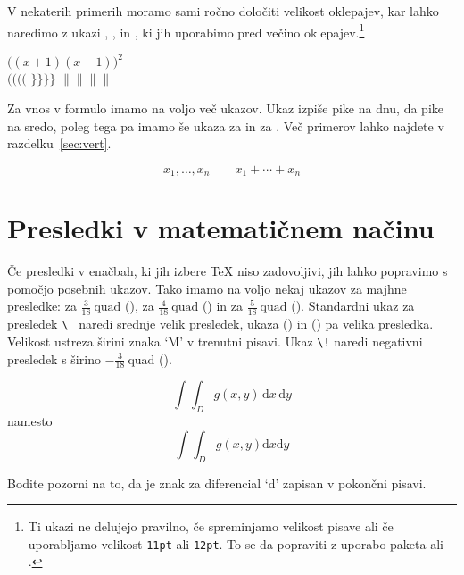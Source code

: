 V nekaterih primerih moramo sami ročno določiti velikost oklepajev, kar lahko
naredimo z ukazi , ,  in 
, ki jih uporabimo pred večino oklepajev.\footnote{Ti ukazi
  ne delujejo pravilno, če spreminjamo velikost pisave ali če uporabljamo 
  velikost \texttt{11pt} ali \texttt{12pt}. To se da popraviti z uporabo paketa  ali .}
\begin{example}
$\Big( (x+1) (x-1) \Big) ^{2}$\\
$\big(\Big(\bigg(\Bigg($\quad
$\big\}\Big\}\bigg\}\Bigg\}$\quad
$\big\|\Big\|\bigg\|\Bigg\|$
\end{example}

Za vnos \textbf{} v formulo imamo na voljo več ukazov.
Ukaz  izpiše pike na dnu,  da pike na sredo, poleg tega pa imamo
še ukaza  za  in  za . 
Več primerov lahko najdete v razdelku~\ref{sec:vert}.
\begin{example}
\begin{displaymath}
x_{1},\ldots,x_{n} \qquad
x_{1}+\cdots+x_{n}
\end{displaymath}
\end{example}
 
\section{Presledki v matematičnem načinu}

 Če presledki v enačbah, ki jih izbere \TeX{}
niso zadovoljivi, jih lahko popravimo s pomočjo posebnih ukazov. 
Tako imamo na voljo nekaj ukazov za majhne presledke: \ci{,} za
$\frac{3}{18}\:\textrm{quad}$ (\demowidth{0.166em}), \ci{:} za $\frac{4}{18}\:
\textrm{quad}$ (\demowidth{0.222em}) in \ci{;} za $\frac{5}{18}\:
\textrm{quad}$ (\demowidth{0.277em}).  Standardni ukaz za presledek 
\verb*.\ . naredi srednje velik presledek, ukaza  
(\demowidth{1em}) in  (\demowidth{2em}) pa velika presledka. 
Velikost  ustreza širini znaka `M' v trenutni pisavi.  Ukaz \verb|\!| naredi 
negativni presledek s širino $-\frac{3}{18}\:\textrm{quad}$ (\demowidth{0.166em}).
\begin{example}
\newcommand{\ud}{\mathrm{d}}
\begin{displaymath}
\int\!\!\!\int_{D} g(x,y)
  \, \ud x\, \ud y 
\end{displaymath}
namesto
\begin{displaymath}
\int\int_{D} g(x,y)\ud x \ud y
\end{displaymath}
\end{example}
Bodite pozorni na to, da je znak za diferencial `d' zapisan v pokončni pisavi.

